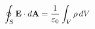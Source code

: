 \documentclass[preview]{standalone}
\begin{document}
\begin{align*}
\special{dvisvgm:raw <g id='unique000'>}\oint_S\mathbf E\cdot d\mathbf A=\frac{1}{\varepsilon_0}\int_V\rho\,dV\special{dvisvgm:raw </g>}
\end{align*}
\end{document}
